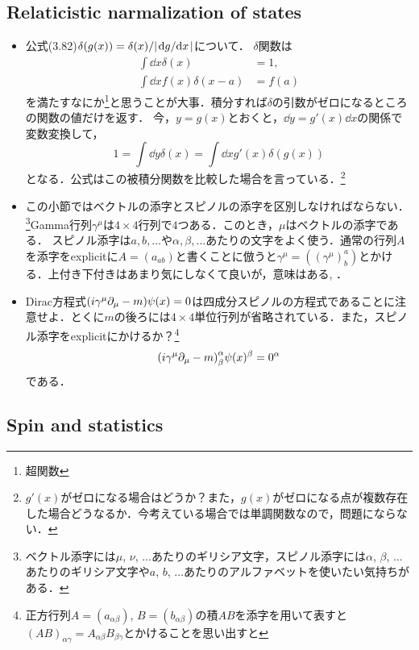 \subsection{Relaticistic narmalization of states}
\begin{itemize}
		\item 公式(3.82)$\delta(g(x)) = \delta(x)/\lvert\dv*{g}{x}\rvert$について．
				$\delta $関数は
				\begin{align}
						\int \dd{x} \delta(x) &= 1, \\
						\int \dd{x} f(x)\delta(x-a) &= f(a)
				\end{align}
				を満たすなにか\footnote{超関数}と思うことが大事．積分すれば$\delta $の引数がゼロになるところの関数の値だけを返す．
				今，$y=g(x)  $とおくと，$\dd{y} = g'(x)\dd{x} $の関係で変数変換して，
				\begin{equation}
						1 = \int\dd{y} \delta(x) = \int \dd{x}g'(x)\delta(g(x))
				\end{equation}
				となる．公式はこの被積分関数を比較した場合を言っている．\footnote{$g'(x)$がゼロになる場合はどうか？また，$g(x) $がゼロになる点が複数存在した場合どうなるか．今考えている場合では単調関数なので，問題にならない．}
		\item この小節ではベクトルの添字とスピノルの添字を区別しなければならない．\footnote{ベクトル添字には$\mu $, $\nu $, $\ldots $あたりのギリシア文字，スピノル添字には$\alpha$, $\beta $, $\ldots $あたりのギリシア文字や$a $, $b $, $\ldots $あたりのアルファベットを使いたい気持ちがある．}Gamma行列$\gamma^{\mu} $は$4\times 4 $行列で$4 $つある．このとき，$\mu $はベクトルの添字である．
				スピノル添字は$a, b,\ldots $や$\alpha, \beta,\ldots $あたりの文字をよく使う．通常の行列$A $を添字をexplicitに$A = (a_{ab}) $と書くことに倣うと$\gamma^{\mu} =(( \gamma^{\mu})_{b}^{a}) $とかける．上付き下付きはあまり気にしなくて良いが，意味はある\cite[Chap.1]{九後1989}, \cite{BB17130464}．
		\item Dirac方程式$\qty(i\gamma^\mu \partial_\mu - m)\psi(x) = 0 $は四成分スピノルの方程式であることに注意せよ．とくに$m $の後ろには$4\times 4 $単位行列が省略されている．また，スピノル添字をexplicitにかけるか？\footnote{正方行列$A =(a_{\alpha\beta})$, $B= (b_{\alpha\beta}) $の積$AB $を添字を用いて表すと$(AB)_{\alpha\gamma} = A_{\alpha\beta}B_{\beta\gamma} $とかけることを思い出すと}
				\begin{equation}
				\qty(i\gamma^{\mu}\partial_{\mu} -m)_{\beta}^{\alpha}\psi(x)^\beta = 0^{\alpha}
				\end{equation}
				である．
\end{itemize}
\subsection{Spin and statistics}
